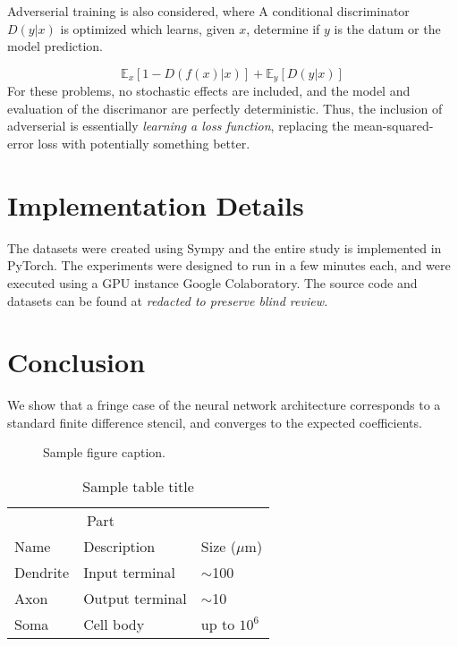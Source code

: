 \documentclass{article}
\begin{document}
Adverserial training is also considered, where
A conditional discriminator $D(y|x)$ is optimized which learns, given $x$, determine if $y$ is the datum or the model prediction. 

\begin{equation}
\mathbb{E}_x\left[ 1 - D\left(f(x)|x\right) \right] + \mathbb{E}_y\left[ D\left(y|x\right)\right]
\end{equation}
For these problems, no stochastic effects are included, and the model and evaluation of the discrimanor are perfectly deterministic. Thus, the inclusion of adverserial is essentially {\em learning a loss function}, replacing the mean-squared-error loss with potentially something better.

\section{Implementation Details}

The datasets were created using Sympy and the entire study is implemented in PyTorch. The experiments were designed to run in a few minutes each, and were executed using a GPU instance Google Colaboratory. The source code and datasets can be found at {\em redacted to preserve blind review.}


\section{Conclusion}
\label{sec:conclusion}

We show that a fringe case of the neural network architecture corresponds to a standard finite difference stencil, and converges to the expected coefficients.

\begin{figure}
  \centering
  \fbox{\rule[-.5cm]{0cm}{4cm} \rule[-.5cm]{4cm}{0cm}}
  \caption{Sample figure caption.}
\end{figure}


\begin{table}
  \caption{Sample table title}
  \label{sample-table}
  \centering
  \begin{tabular}{lll}
    \toprule
    \multicolumn{2}{c}{Part}                   \\
    \cmidrule(r){1-2}
    Name     & Description     & Size ($\mu$m) \\
    \midrule
    Dendrite & Input terminal  & $\sim$100     \\
    Axon     & Output terminal & $\sim$10      \\
    Soma     & Cell body       & up to $10^6$  \\
    \bottomrule
  \end{tabular}
\end{table}
\end{document}
